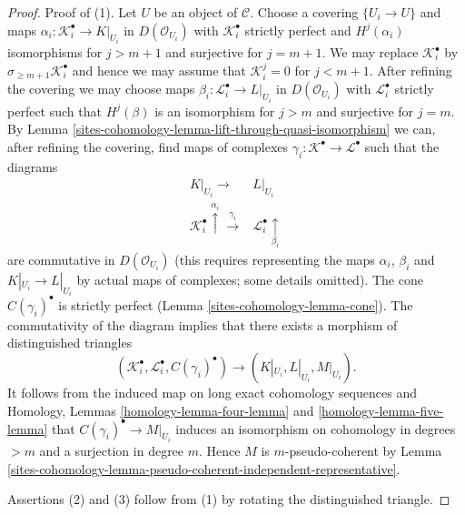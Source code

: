\begin{proof}
Proof of (1). Let $U$ be an object of $\mathcal{C}$. Choose a covering
$\{U_i \to U\}$ and maps $\alpha_i : \mathcal{K}_i^\bullet \to K|_{U_i}$
in $D(\mathcal{O}_{U_i})$ with $\mathcal{K}_i^\bullet$ strictly perfect and
$H^j(\alpha_i)$ isomorphisms for $j > m + 1$ and surjective for $j = m + 1$.
We may replace $\mathcal{K}_i^\bullet$ by
$\sigma_{\geq m + 1}\mathcal{K}_i^\bullet$
and hence we may assume that $\mathcal{K}_i^j = 0$
for $j < m + 1$. After refining the covering we may choose
maps $\beta_i : \mathcal{L}_i^\bullet \to L|_{U_i}$ in $D(\mathcal{O}_{U_i})$
with $\mathcal{L}_i^\bullet$ strictly perfect such that
$H^j(\beta)$ is an isomorphism for $j > m$ and
surjective for $j = m$. By
Lemma \ref{sites-cohomology-lemma-lift-through-quasi-isomorphism}
we can, after refining the covering, find maps of complexes
$\gamma_i : \mathcal{K}^\bullet \to \mathcal{L}^\bullet$
such that the diagrams
$$
\begin{array}{cc}K|_{U_i} \longrightarrow & L|_{U_i} \\ \mathcal{K}_i^\bullet \overset{\alpha_i}{\uparrow}\overset{\gamma_i}{\longrightarrow} & \mathcal{L}_i^\bullet \underset{\beta_i}{\uparrow}\end{array}
$$
are commutative in $D(\mathcal{O}_{U_i})$ (this requires representing the
maps $\alpha_i$, $\beta_i$ and $K|_{U_i} \to L|_{U_i}$
by actual maps of complexes; some details omitted).
The cone $C(\gamma_i)^\bullet$ is strictly perfect (Lemma \ref{sites-cohomology-lemma-cone}).
The commutativity of the diagram implies that there exists a morphism
of distinguished triangles
$$
(\mathcal{K}_i^\bullet, \mathcal{L}_i^\bullet, C(\gamma_i)^\bullet)
\longrightarrow
(K|_{U_i}, L|_{U_i}, M|_{U_i}).
$$
It follows from the induced map on long exact cohomology sequences and
Homology, Lemmas \ref{homology-lemma-four-lemma} and
\ref{homology-lemma-five-lemma}
that $C(\gamma_i)^\bullet \to M|_{U_i}$ induces an isomorphism
on cohomology in degrees $> m$ and a surjection in degree $m$.
Hence $M$ is $m$-pseudo-coherent by
Lemma \ref{sites-cohomology-lemma-pseudo-coherent-independent-representative}.

\medskip\noindent
Assertions (2) and (3) follow from (1) by rotating the distinguished
triangle.
\end{proof}

